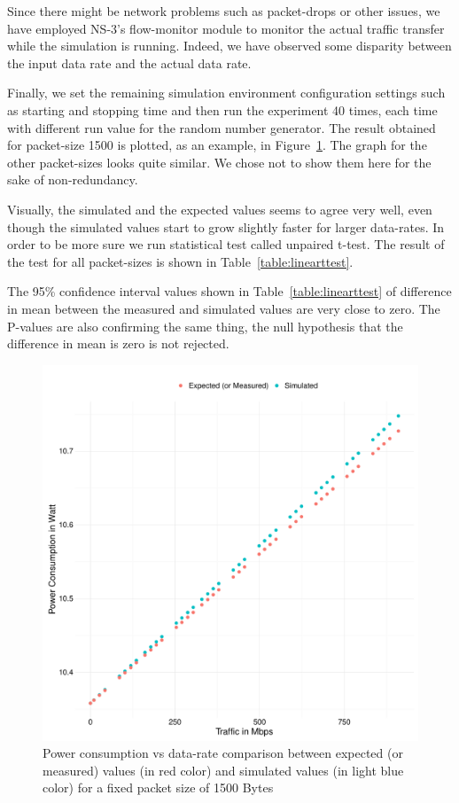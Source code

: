 Since there might be network problems such as packet-drops or other issues, we have employed NS-3's flow-monitor module to monitor the actual traffic transfer while the simulation is running. Indeed, we have observed some disparity between the input data rate and the actual data rate. 

Finally, we set the remaining simulation environment configuration settings such as starting and stopping time and then run the experiment 40 times, each time with different run value for the random number generator. The result obtained for packet-size 1500 is plotted, as an example, in Figure~\ref{fig:linear}. The graph for the other packet-sizes looks quite similar. We chose not to show them here for the sake of non-redundancy. 

Visually, the simulated and the expected values seems to agree very well, even though the simulated values start to grow slightly faster for larger data-rates. In order to be more sure we run statistical test called unpaired t-test. The result of the test for all packet-sizes is shown in Table~\ref{table:linearttest}. 

The 95\% confidence interval values shown in Table~\ref{table:linearttest} of difference in mean between the measured and simulated values are very close to zero. The P-values are also confirming the same thing, the null hypothesis that the difference in mean is zero is not rejected. 

\begin{figure}[ht]
	\begin{center}
		\includegraphics[width=14cm]{images/simulatedvsexpectedlinear.pdf}
		\caption{Power consumption vs data-rate comparison between expected (or measured) values (in red color) and simulated values (in light blue color) for a fixed packet size of 1500 Bytes}
		\label{fig:linear}
	\end{center}
\end{figure}

